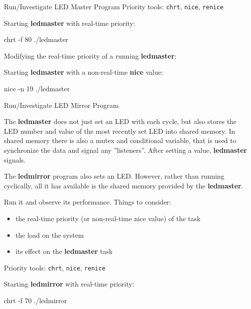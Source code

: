 \begin{Lab}
\begin{exe} {Run/Investigate LED Master Program}
   Priority tools: \texttt{chrt}, \texttt{nice}, \texttt{renice}

   Starting \textbf{ledmaster} with real-time priority:
   \begin{raw}
chrt -f 80 ./ledmaster
   \end{raw}

   Modifying the real-time priority of a running \textbf{ledmaster}:

   Starting \textbf{ledmaster} with a non-real-time \textbf{nice} value:
   \begin{raw}
nice -n 19 ./ledmaster
   \end{raw}

\end{exe}

\clearpage

\begin{exe} {Run/Investigate LED Mirror Program}

   The \textbf{ledmaster} does not just set an LED with each
   cycle, but also stores the LED number and value of the
   most recently set LED into shared memory. In shared memory
   there is also a mutex and conditional variable, that is
   used to synchronize the data and signal any ''listeners''.
   After setting a value, \textbf{ledmaster} signals.

   The \textbf{ledmirror} program also sets an LED. However,
   rather than running cyclically, all it has available is the
   shared memory provided by the \textbf{ledmaster}.

   Run it and observe its performance. Things to consider:

   \begin{itemize}
      \item
      the real-time priority (or non-real-time nice value) of the task
      \item
      the load on the system
      \item
      its effect on the \textbf{ledmaster} task
   \end{itemize}

   Priority tools: \texttt{chrt}, \texttt{nice}, \texttt{renice}

   Starting \textbf{ledmirror} with real-time priority:
   \begin{raw}
chrt -f 70 ./ledmirror
   \end{raw}


\end{exe}
\end{Lab}
